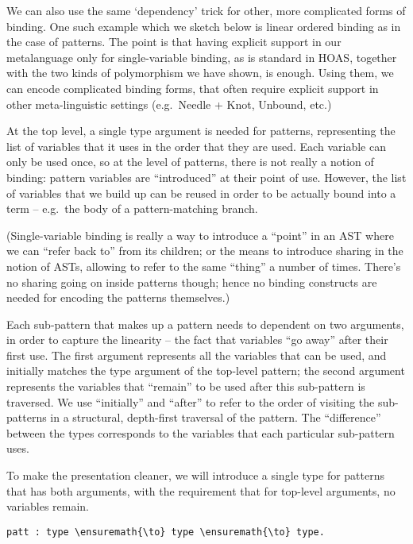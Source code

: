 We can also use the same `dependency' trick for other, more complicated
forms of binding. One such example which we sketch below is linear
ordered binding as in the case of patterns. The point is that having
explicit support in our metalanguage only for single-variable binding,
as is standard in HOAS, together with the two kinds of polymorphism we
have shown, is enough. Using them, we can encode complicated binding
forms, that often require explicit support in other meta-linguistic
settings (e.g.~Needle + Knot, Unbound, etc.)

At the top level, a single type argument is needed for patterns,
representing the list of variables that it uses in the order that they
are used. Each variable can only be used once, so at the level of
patterns, there is not really a notion of binding: pattern variables are
``introduced'' at their point of use. However, the list of variables
that we build up can be reused in order to be actually bound into a term
-- e.g.~the body of a pattern-matching branch.

(Single-variable binding is really a way to introduce a ``point'' in an
AST where we can ``refer back to'' from its children; or the means to
introduce sharing in the notion of ASTs, allowing to refer to the same
``thing'' a number of times. There's no sharing going on inside patterns
though; hence no binding constructs are needed for encoding the patterns
themselves.)

Each sub-pattern that makes up a pattern needs to dependent on two
arguments, in order to capture the linearity -- the fact that variables
``go away'' after their first use. The first argument represents all the
variables that can be used, and initially matches the type argument of
the top-level pattern; the second argument represents the variables that
``remain'' to be used after this sub-pattern is traversed. We use
``initially'' and ``after'' to refer to the order of visiting the
sub-patterns in a structural, depth-first traversal of the pattern. The
``difference'' between the types corresponds to the variables that each
particular sub-pattern uses.

To make the presentation cleaner, we will introduce a single type for
patterns that has both arguments, with the requirement that for
top-level arguments, no variables remain.

\begin{verbatim}
patt : type \ensuremath{\to} type \ensuremath{\to} type.
\end{verbatim}

